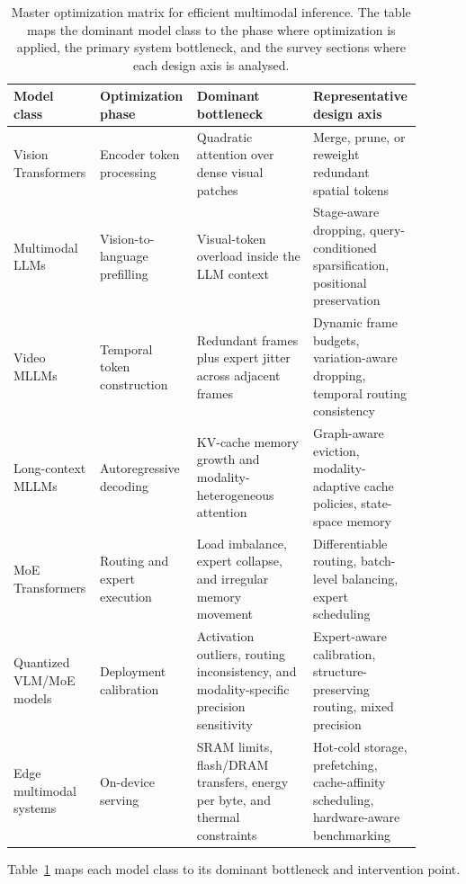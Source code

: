 \documentclass[10pt]{article}
\begin{document}
\begin{table}[t]
\centering
\caption{Master optimization matrix for efficient multimodal inference.  The table
maps the dominant model class to the phase where optimization is applied, the primary
system bottleneck, and the survey sections where each design axis is analysed.}
\label{tab:master-optimization-matrix}
\small
\setlength{\tabcolsep}{4pt}
\begin{tabular}{p{0.20\linewidth} p{0.20\linewidth} p{0.28\linewidth} p{0.22\linewidth}}
\toprule
\textbf{Model class} & \textbf{Optimization phase} & \textbf{Dominant bottleneck} & \textbf{Representative design axis} \\
\midrule
Vision Transformers & Encoder token processing & Quadratic attention over dense visual patches & Merge, prune, or reweight redundant spatial tokens \\
Multimodal LLMs & Vision-to-language prefilling & Visual-token overload inside the LLM context & Stage-aware dropping, query-conditioned sparsification, positional preservation \\
Video MLLMs & Temporal token construction & Redundant frames plus expert jitter across adjacent frames & Dynamic frame budgets, variation-aware dropping, temporal routing consistency \\
Long-context MLLMs & Autoregressive decoding & KV-cache memory growth and modality-heterogeneous attention & Graph-aware eviction, modality-adaptive cache policies, state-space memory \\
MoE Transformers & Routing and expert execution & Load imbalance, expert collapse, and irregular memory movement & Differentiable routing, batch-level balancing, expert scheduling \\
Quantized VLM/MoE models & Deployment calibration & Activation outliers, routing inconsistency, and modality-specific precision sensitivity & Expert-aware calibration, structure-preserving routing, mixed precision \\
Edge multimodal systems & On-device serving & SRAM limits, flash/DRAM transfers, energy per byte, and thermal constraints & Hot-cold storage, prefetching, cache-affinity scheduling, hardware-aware benchmarking \\
\bottomrule
\end{tabular}
\end{table}
Table~\ref{tab:master-optimization-matrix} maps each model class to its dominant
bottleneck and intervention point.
\end{document}
